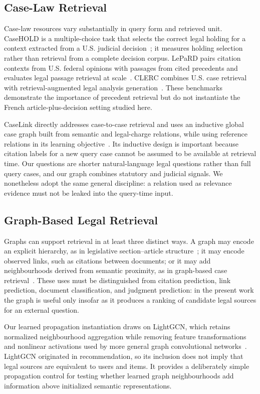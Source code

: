 \documentclass[runningheads]{llncs}
\begin{document}
\subsection{Case-Law Retrieval}

Case-law resources vary substantially in query form and retrieved unit. CaseHOLD is a multiple-choice task that selects the correct legal holding for a context extracted from a U.S. judicial decision~\cite{zheng2021casehold}; it measures holding selection rather than retrieval from a complete decision corpus. LePaRD pairs citation contexts from U.S. federal opinions with passages from cited precedents and evaluates legal passage retrieval at scale~\cite{mahari2024lepard}. CLERC combines U.S. case retrieval with retrieval-augmented legal analysis generation~\cite{hou2024clerc}. These benchmarks demonstrate the importance of precedent retrieval but do not instantiate the French article-plus-decision setting studied here.

CaseLink directly addresses case-to-case retrieval and uses an inductive global case graph built from semantic and legal-charge relations, while using reference relations in its learning objective~\cite{tang2024caselink}. Its inductive design is important because citation labels for a new query case cannot be assumed to be available at retrieval time. Our questions are shorter natural-language legal questions rather than full query cases, and our graph combines statutory and judicial signals. We nonetheless adopt the same general discipline: a relation used as relevance evidence must not be leaked into the query-time input.

\subsection{Graph-Based Legal Retrieval}

Graphs can support retrieval in at least three distinct ways. A graph may encode an explicit hierarchy, as in legislative section--article structure~\cite{louis2023finding}; it may encode observed links, such as citations between documents; or it may add neighbourhoods derived from semantic proximity, as in graph-based case retrieval~\cite{tang2024caselink}. These uses must be distinguished from citation prediction, link prediction, document classification, and judgment prediction: in the present work the graph is useful only insofar as it produces a ranking of candidate legal sources for an external question.

Our learned propagation instantiation draws on LightGCN, which retains normalized neighbourhood aggregation while removing feature transformations and nonlinear activations used by more general graph convolutional networks~\cite{he2020lightgcn}. LightGCN originated in recommendation, so its inclusion does not imply that legal sources are equivalent to users and items. It provides a deliberately simple propagation control for testing whether learned graph neighbourhoods add information above initialized semantic representations.
\end{document}
